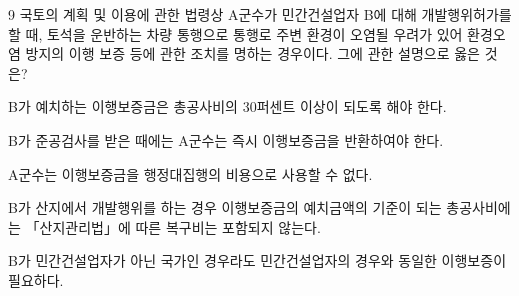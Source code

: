 \begin{question}{9}
국토의 계획 및 이용에 관한 법령상 A군수가 민간건설업자 B에 대해 개발행위허가를 할 때, 토석을 운반하는 차량 통행으로 통행로 주변 환경이 오염될 우려가 있어 환경오염 방지의 이행 보증 등에 관한 조치를 명하는 경우이다. 그에 관한 설명으로 옳은 것은?
\begin{choices}
  \item B가 예치하는 이행보증금은 총공사비의 30퍼센트 이상이 되도록 해야 한다.
  \item B가 준공검사를 받은 때에는 A군수는 즉시 이행보증금을 반환하여야 한다.
  \item A군수는 이행보증금을 행정대집행의 비용으로 사용할 수 없다.
  \item B가 산지에서 개발행위를 하는 경우 이행보증금의 예치금액의 기준이 되는 총공사비에는 「산지관리법」에 따른 복구비는 포함되지 않는다.
  \item B가 민간건설업자가 아닌 국가인 경우라도 민간건설업자의 경우와 동일한 이행보증이 필요하다.
\end{choices}
\end{question}
